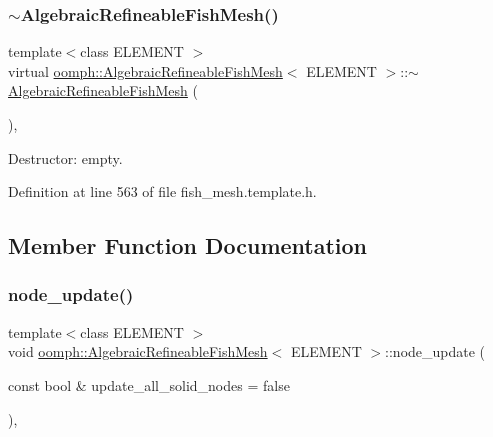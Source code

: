 \mbox{\label{classoomph_1_1AlgebraicRefineableFishMesh_a69145c9bf09e0fbc1a4bffe7bee379cd}} 
\subsubsection{\texorpdfstring{$\sim$\+Algebraic\+Refineable\+Fish\+Mesh()}{~AlgebraicRefineableFishMesh()}}
{\footnotesize\ttfamily template$<$class E\+L\+E\+M\+E\+NT $>$ \\
virtual \hyperlink{classoomph_1_1AlgebraicRefineableFishMesh}{oomph\+::\+Algebraic\+Refineable\+Fish\+Mesh}$<$ E\+L\+E\+M\+E\+NT $>$\+::$\sim$\hyperlink{classoomph_1_1AlgebraicRefineableFishMesh}{Algebraic\+Refineable\+Fish\+Mesh} (\begin{DoxyParamCaption}{ }\end{DoxyParamCaption})\hspace{0.3cm}{\ttfamily [inline]}, {\ttfamily [virtual]}}



Destructor\+: empty. 



Definition at line 563 of file fish\+\_\+mesh.\+template.\+h.



\subsection{Member Function Documentation}
\mbox{\label{classoomph_1_1AlgebraicRefineableFishMesh_a8123da4b48355b39f19e0494a9d4545c}} 
\subsubsection{\texorpdfstring{node\+\_\+update()}{node\_update()}}
{\footnotesize\ttfamily template$<$class E\+L\+E\+M\+E\+NT $>$ \\
void \hyperlink{classoomph_1_1AlgebraicRefineableFishMesh}{oomph\+::\+Algebraic\+Refineable\+Fish\+Mesh}$<$ E\+L\+E\+M\+E\+NT $>$\+::node\+\_\+update (\begin{DoxyParamCaption}\item[{const bool \&}]{update\+\_\+all\+\_\+solid\+\_\+nodes = {\ttfamily false} }\end{DoxyParamCaption})\hspace{0.3cm}{\ttfamily [inline]}, {\ttfamily [virtual]}}



